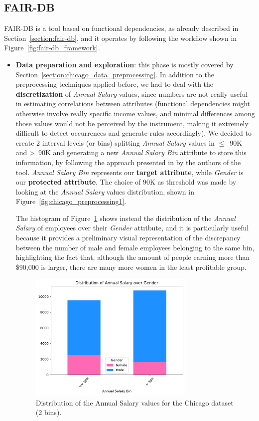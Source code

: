 \subsection{FAIR-DB}
\label{section:chicago_fair-db}
FAIR-DB is a tool based on functional dependencies, as already described in Section~\ref{section:fair-db}, and it operates by following the workflow shown in Figure~\ref{fig:fair-db_framework}.
\begin{itemize}
\item \textbf{Data preparation and exploration}: this phase is mostly covered by Section~\ref{section:chicago_data_preprocessing}. In addition to the preprocessing techniques applied before, we had to deal with the \textbf{discretization} of \textit{Annual Salary} values, since numbers are not really useful in estimating correlations between attributes (functional dependencies might otherwise involve really specific income values, and minimal differences among those values would not be perceived by the instrument, making it extremely difficult to detect occurrences and generate rules accordingly). We decided to create 2 interval levels (or bins) splitting \textit{Annual Salary} values in \(\leq\)~90K and >~90K and generating a new \textit{Annual Salary Bin} attribute to store this information, by following the approach presented in \cite{azzalini2021fair} by the authors of the tool. \textit{Annual Salary Bin} represents our \textbf{target attribute}, while \textit{Gender} is our \textbf{protected attribute}. The choice of 90K as threshold was made by looking at the \textit{Annual Salary} values distribution, shown in Figure~\ref{fig:chicago_preprocessing1}.

The histogram of Figure~\ref{fig:chicago_fair-db1} shows instead the distribution of the \textit{Annual Salary} of employees over their \textit{Gender} attribute, and it is particularly useful because it provides a preliminary visual representation of the discrepancy between the number of male and female employees belonging to the same bin, highlighting the fact that, although the amount of people earning more than \$90,000 is larger, there are many more women in the least profitable group.

\begin{figure}[t!]
\centering
\includegraphics[width=0.75\textwidth]{figures/chicago_2bins_annual_salary_over_gender.pdf}
\caption{Distribution of the \textrm{Annual Salary} values for the Chicago dataset (2 bins).}
\label{fig:chicago_fair-db1}
\end{figure}


\end{itemize}

